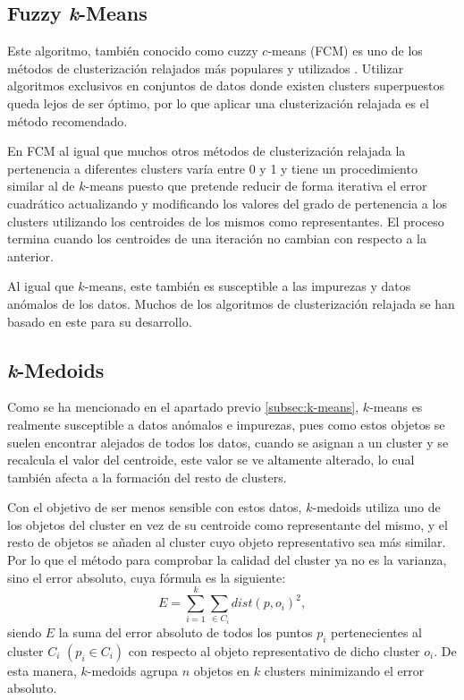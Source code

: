 \documentclass[10pt, a4paper]{article}
\begin{document}

\subsection{\textbf
{Fuzzy \textit{k}-Means}}

Este algoritmo, también conocido como cuzzy $c$-means (FCM) \cite{fuzzymeans} es uno de los métodos de clusterización relajados más populares y utilizados \cite{otrolibro}. Utilizar algoritmos exclusivos en conjuntos de datos donde existen clusters superpuestos queda lejos de ser óptimo, por lo que aplicar una clusterización relajada es el método recomendado.

En FCM al igual que muchos otros métodos de clusterización relajada la pertenencia a diferentes clusters varía entre 0 y 1 y tiene un procedimiento similar al de $k$-means puesto que pretende reducir de forma iterativa el error cuadrático actualizando y modificando los valores del grado de pertenencia a los clusters utilizando los centroides de los mismos como representantes. El proceso termina cuando los centroides de una iteración no cambian con respecto a la anterior.

Al igual que $k$-means, este también es susceptible a las impurezas y datos anómalos de los datos. Muchos de los algoritmos de clusterización relajada se han basado en este para su desarrollo.





\subsection{\textbf{\textit{k}-Medoids}} \label{subsec:k-medoids}

Como se ha mencionado en el apartado previo \ref{subsec:k-means}, $k$-means es realmente susceptible a datos anómalos e impurezas, pues como estos objetos se suelen encontrar alejados de todos los datos, cuando se asignan a un cluster y se recalcula el valor del centroide, este valor se ve altamente alterado, lo cual también afecta a la formación del resto de clusters.

Con el objetivo de ser menos sensible con estos datos, $k$-medoids utiliza uno de los objetos del cluster en vez de su centroide como representante del mismo, y el resto de objetos se añaden al cluster cuyo objeto representativo sea más similar. Por lo que el método para comprobar la calidad del cluster ya no es la varianza, sino el error absoluto, cuya fórmula es la siguiente: \begin{equation} \label{eq:k-medoids} E =  \sum_{i=1}^{k}  \sum_{ \in C_i} dist(p, o_i)^2 , \end{equation} siendo $E$ la suma del error absoluto de todos los puntos $p_i$ pertenecientes al cluster $C_i$ $\left(p_i \in C_i \right)$ con respecto al objeto representativo de dicho cluster $o_i$. De esta manera, $k$-medoids agrupa $n$ objetos en $k$ clusters minimizando el error absoluto. 
\end{document}
